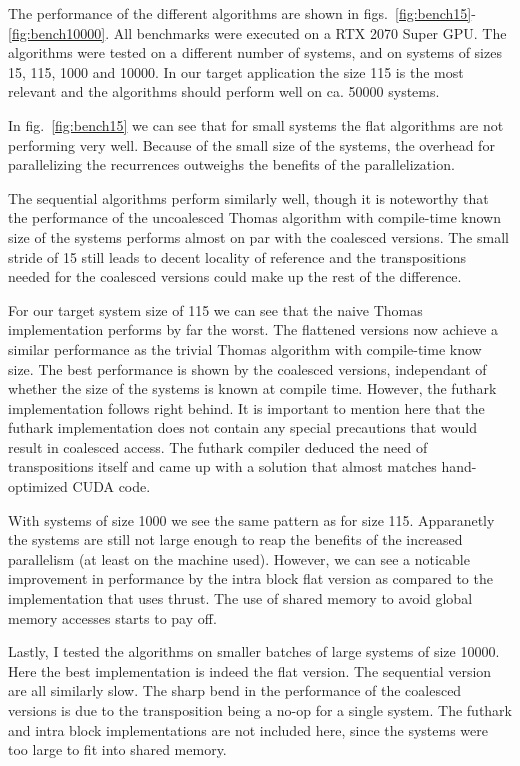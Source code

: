 \documentclass[a4paper,oneside]{memoir}
\begin{document}
The performance of the different algorithms are shown in figs.~\ref{fig:bench15}-\ref{fig:bench10000}. All benchmarks were executed on a RTX 2070 Super GPU. 
The algorithms were tested on a different number of systems, and on systems of sizes 15, 115, 1000 and 10000. In our target application the size 115 is the most relevant and the algorithms should perform well on ca. 50000 systems.

In fig.~\ref{fig:bench15} we can see that for small systems the flat algorithms are not performing very well. Because of the small size of the systems, the overhead for parallelizing the recurrences outweighs the benefits of the parallelization.

The sequential algorithms perform similarly well, though it is noteworthy that the performance of the uncoalesced Thomas algorithm with compile-time known size of the systems performs almost on par with the coalesced versions. The small stride of 15 still leads to decent locality of reference and the transpositions needed for the coalesced versions could make up the rest of the difference.

For our target system size of 115 we can see that the naive Thomas implementation performs by far the worst. The flattened versions now achieve a similar performance as the trivial Thomas algorithm with compile-time know size.
The best performance is shown by the coalesced versions, independant of whether the size of the systems is known at compile time. However, the futhark implementation follows right behind. It is important to mention here that the futhark implementation does not contain any special precautions that would result in coalesced access. The futhark compiler deduced the need of transpositions itself and came up with a solution that almost matches hand-optimized CUDA code.

With systems of size 1000 we see the same pattern as for size 115. Apparanetly the systems are still not large enough to reap the benefits of the increased parallelism (at least on the machine used). However, we can see a noticable improvement in performance by the intra block flat version as compared to the implementation that uses thrust. The use of shared memory to avoid global memory accesses starts to pay off.

Lastly, I tested the algorithms on smaller batches of large systems of size 10000. Here the best implementation is indeed the flat version. The sequential version are all similarly slow. The sharp bend in the performance of the coalesced versions is due to the transposition being a no-op for a single system.
The futhark and intra block implementations are not included here, since the systems were too large to fit into shared memory. 
\end{document}
